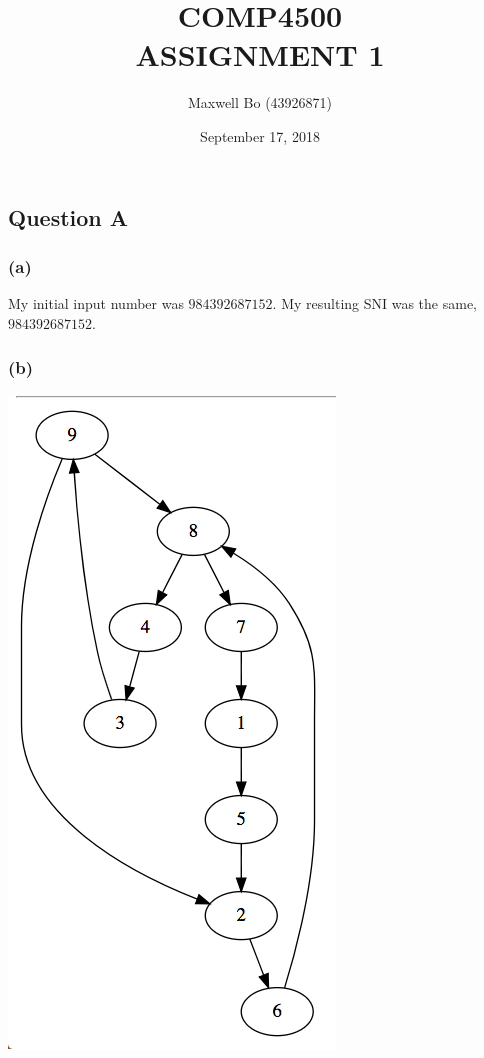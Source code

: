 \documentclass[11pt,a4paper]{article}
\begin{document}
\title{COMP4500 \\ ASSIGNMENT 1}
\author{Maxwell Bo (43926871)}
\date{September 17, 2018}
\maketitle

\subsection*{Question A}
\subsubsection*{(a)}

My initial input number was $984392687152$. My resulting SNI was the same, $984392687152$.

\subsubsection*{(b)}

\includegraphics[width=\textwidth]{graph}
\end{document}
